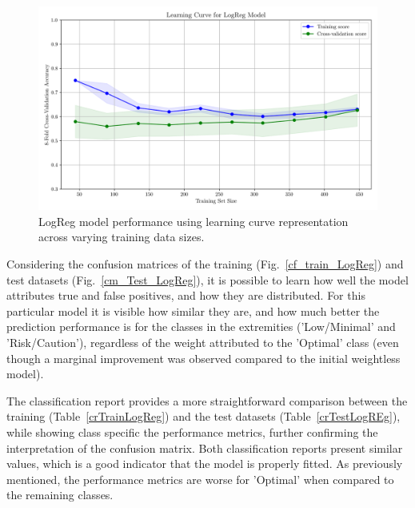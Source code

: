 \documentclass[conference]{IEEEtran}
\begin{document}
\begin{figure}[H]
    \centering
    \includegraphics[width=1\linewidth]{assets/LOGR_lercurve.png}
    \caption{LogReg model performance using learning curve representation across varying training data sizes.}
    \label{lcLogReg}
\end{figure} %

Considering the confusion matrices of the training (Fig.~\ref{cf_train_LogReg}) and test datasets (Fig.~\ref{cm_Test_LogReg}), it is possible to learn how well the model attributes true and false positives, and how they are distributed. For this particular model it is visible how similar they are, and how much better the prediction performance is for the classes in the extremities ('Low/Minimal' and 'Risk/Caution'), regardless of the weight attributed to the 'Optimal' class (even though a marginal improvement was observed compared to the initial weightless model).

The classification report provides a more straightforward comparison between the training (Table~\ref{crTrainLogReg}) and the test datasets (Table~\ref{crTestLogREg}), while showing class specific the performance metrics, further confirming the interpretation of the confusion matrix. Both classification reports present similar values, which is a good indicator that the model is properly fitted. As previously mentioned, the performance metrics are worse for 'Optimal' when compared to the remaining classes.
\end{document}
